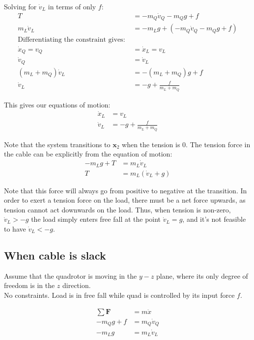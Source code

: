 \documentclass[11pt]{article}
\begin{document}
Solving for $\dot{v}_L$ in terms of only $f$:
\begin{align*}
T &= - m_Q \dot{v}_Q - m_Q g + f \\
m_L \dot{v}_L &= -m_L g +(- m_Q \dot{v}_Q - m_Q g + f ) \\
\text{Differentiating the constraint gives: } & \\
\dot{x}_Q = v_Q &= \dot{x}_L = v_L \\
\dot{v}_Q &= \dot{v}_L \\
(m_L+m_Q) \dot{v}_L &= -(m_L+m_Q) g + f \\
\dot{v}_L &= -g +\frac{f}{m_L+m_Q}
\end{align*} 

This gives our equations of motion: 
\begin{align*}
\dot{x}_L &= v_L \\
\dot{v}_L &= -g +\frac{f}{m_L+m_Q}
\end{align*} 

Note that the system transitions to $\mathbf{x}_2$ when the tension is 0. The tension force in the cable can be explicitly from the equation of motion:
\begin{align*}
-m_L g + T &= m_L \dot{v}_L \\
T &= m_L (\dot{v}_L + g)
\end{align*}

Note that this force will always go from positive to negative at the transition. In order to exert a tension force on the load, there must be a net force upwards, as tension cannot act downwards on the load. Thus, when tension is non-zero, $\dot{v}_L > -g$ the load simply enters free fall at the point $\dot{v}_L=g$, and it's not feasible to have $\dot{v}_L < -g$. 







\newpage
\subsection{When cable is slack}

Assume that the quadrotor is moving in the $y-z$ plane, where its only degree of freedom is in the $z$ direction.  \\
No constraints. Load is in free fall while quad is controlled by its input force $f$. 

\mbox{} \newline
\begin{align*}
\sum \mathbf{F} &= m \ddot{x} \\
-m_Q g + f &= m_Q \dot{v}_Q \\
-m_L g &= m_L \dot{v}_L
\end{align*}
\end{document}

